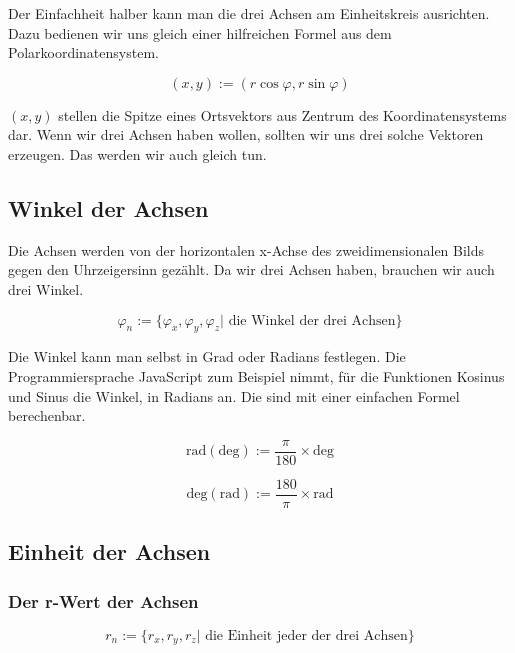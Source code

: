 \documentclass[a4paper]{article}
\begin{document}
Der Einfachheit halber kann man die drei Achsen am Einheitskreis ausrichten. Dazu bedienen wir uns gleich einer hilfreichen Formel aus dem Polarkoordinatensystem.

\begin{displaymath}
	(x,y) := (r \cos \varphi, r \sin \varphi)
\end{displaymath}

$(x,y)$ stellen die Spitze eines Ortsvektors aus Zentrum des Koordinatensystems dar. Wenn wir drei Achsen haben wollen, sollten wir
uns drei solche Vektoren erzeugen. Das werden wir auch gleich tun. 


\subsection{Winkel der Achsen}

Die Achsen werden von der horizontalen x-Achse des zweidimensionalen Bilds gegen den Uhrzeigersinn gez\"ahlt. Da wir drei Achsen haben, brauchen wir auch drei Winkel.

\begin{displaymath}
	\varphi_n := \{ \varphi_x, \varphi_y, \varphi_z | \mbox{ die Winkel der drei Achsen}\}
\end{displaymath}

Die Winkel kann man selbst in Grad oder Radians festlegen. Die Programmiersprache JavaScript zum Beispiel nimmt, f\"ur die Funktionen Kosinus und Sinus die Winkel, in Radians an. Die sind mit einer einfachen Formel berechenbar.

\begin{displaymath}
	\mbox{rad}(\mbox{deg}) := \frac{\pi}{180} \times \mbox{deg}
\end{displaymath}

\begin{displaymath}
	\mbox{deg}(\mbox{rad}) := \frac{180}{\pi} \times \mbox{rad}
\end{displaymath}

\subsection{Einheit der Achsen}
\subsubsection{Der r-Wert der Achsen}

\begin{displaymath}
	r_n := \{ r_x , r_y , r_z | \mbox{ die Einheit jeder der drei Achsen}\}
\end{displaymath}
\end{document}
